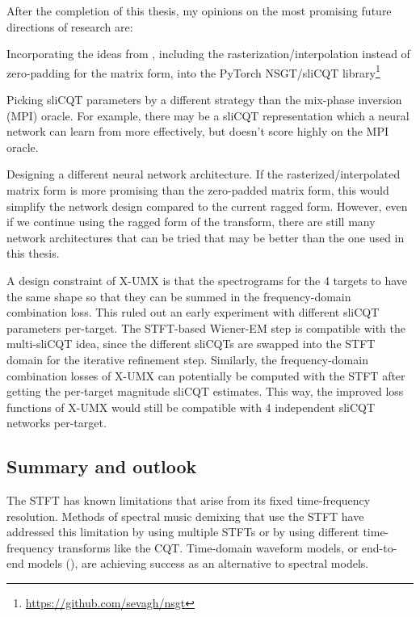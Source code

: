 \documentclass[report.tex]{subfiles}
\begin{document}
After the completion of this thesis, my opinions on the most promising future directions of research are:
\begin{tight_enumerate}
	\item
		Incorporating the ideas from \textcite{variableq1}, including the rasterization/interpolation instead of zero-padding for the matrix form, into the PyTorch NSGT/sliCQT library\footnote{\url{https://github.com/sevagh/nsgt}}
	\item
		Picking sliCQT parameters by a different strategy than the mix-phase inversion (MPI) oracle. For example, there may be a sliCQT representation which a neural network can learn from more effectively, but doesn't score highly on the MPI oracle.
	\item
		Designing a different neural network architecture. If the rasterized/interpolated matrix form is more promising than the zero-padded matrix form, this would simplify the network design compared to the current ragged form. However, even if we continue using the ragged form of the transform, there are still many network architectures that can be tried that may be better than the one used in this thesis.
\end{tight_enumerate}

A design constraint of X-UMX is that the spectrograms for the 4 targets to have the same shape so that they can be summed in the frequency-domain combination loss. This ruled out an early experiment with different sliCQT parameters per-target. The STFT-based Wiener-EM step is compatible with the multi-sliCQT idea, since the different sliCQTs are swapped into the STFT domain for the iterative refinement step. Similarly, the frequency-domain combination losses of X-UMX can potentially be computed with the STFT after getting the per-target magnitude sliCQT estimates. This way, the improved loss functions of X-UMX would still be compatible with 4 independent sliCQT networks per-target.

\subsection{Summary and outlook}

The STFT has known limitations that arise from its fixed time-frequency resolution. Methods of spectral music demixing that use the STFT have addressed this limitation by using multiple STFTs or by using different time-frequency transforms like the CQT. Time-domain waveform models, or end-to-end models (\cite{waveunet, demucs, endtoend}), are achieving success as an alternative to spectral models.
\end{document}

